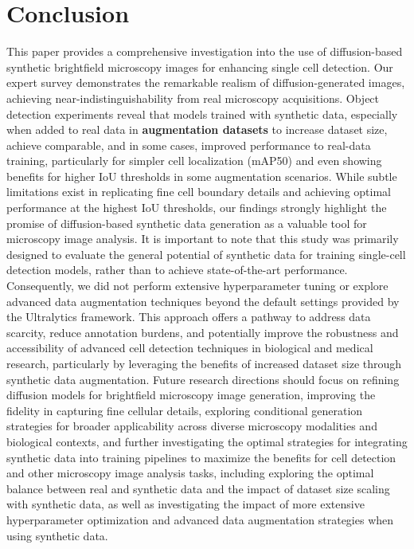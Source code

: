 \section{Conclusion}
\label{sec:conclusion}
This paper provides a comprehensive investigation into the use of diffusion-based synthetic brightfield microscopy images for enhancing single cell detection.
Our expert survey demonstrates the remarkable realism of diffusion-generated images, achieving near-indistinguishability from real microscopy acquisitions.
Object detection experiments reveal that models trained with synthetic data, especially when added to real data in \textbf{augmentation datasets} to increase dataset size, achieve comparable, and in some cases,
improved performance to real-data training, particularly for simpler cell localization (mAP\@50) and even showing benefits for higher IoU thresholds in some augmentation scenarios.
While subtle limitations exist in  replicating fine cell boundary details and achieving optimal performance at the highest IoU thresholds, our findings strongly highlight the promise of diffusion-based synthetic data generation as a valuable tool for microscopy image analysis.
It is important to note that this study was primarily designed to evaluate the general potential of synthetic data for training single-cell detection models, rather than to achieve state-of-the-art performance.
Consequently, we did not perform extensive hyperparameter tuning or explore advanced data augmentation techniques beyond the default settings provided by the Ultralytics framework.
This approach offers a pathway to address data scarcity, reduce annotation burdens, and potentially improve the robustness and accessibility of advanced cell detection techniques in biological and medical research,
particularly by leveraging the benefits of increased dataset size through synthetic data augmentation.
Future research directions should focus on refining diffusion models for brightfield microscopy image generation, improving the fidelity in capturing fine cellular details,
exploring conditional generation strategies for broader applicability across diverse microscopy modalities and biological contexts, and further investigating the optimal strategies for integrating synthetic data into training pipelines
to maximize the benefits for cell detection and other microscopy image analysis tasks, including exploring the optimal balance between real and synthetic data and the impact of dataset size scaling with synthetic data,
as well as investigating the impact of more extensive hyperparameter optimization and advanced data augmentation strategies when using synthetic data.
